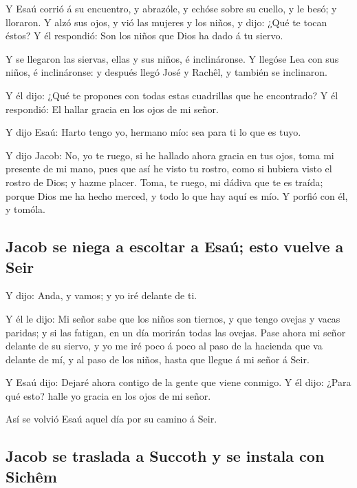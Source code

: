  Y Esaú corrió á su encuentro, y abrazóle, y echóse sobre su
cuello, y le besó; y lloraron.  Y alzó sus ojos, y vió las
mujeres y los niños, y dijo: ¿Qué te tocan éstos? Y él respondió: Son
los niños que Dios ha dado á tu siervo.

 Y se llegaron las siervas, ellas y sus niños, é
inclináronse.  Y llegóse Lea con sus niños, é inclináronse:
y después llegó José y Rachêl, y también se inclinaron.

 Y él dijo: ¿Qué te propones con todas estas cuadrillas que
he encontrado? Y él respondió: El hallar gracia en los ojos de mi señor.

 Y dijo Esaú: Harto tengo yo, hermano mío: sea para ti lo
que es tuyo.

 Y dijo Jacob: No, yo te ruego, si he hallado ahora gracia
en tus ojos, toma mi presente de mi mano, pues que así he visto tu
rostro, como si hubiera visto el rostro de Dios; y hazme placer.
 Toma, te ruego, mi dádiva que te es traída; porque Dios me
ha hecho merced, y todo lo que hay aquí es mío. Y porfió con él, y
tomóla.

\hypertarget{jacob-se-niega-a-escoltar-a-esauxfa-esto-vuelve-a-seir}{%
\subsection{Jacob se niega a escoltar a Esaú; esto vuelve a
Seir}\label{jacob-se-niega-a-escoltar-a-esauxfa-esto-vuelve-a-seir}}

 Y dijo: Anda, y vamos; y yo iré delante de ti.

 Y él le dijo: Mi señor sabe que los niños son tiernos, y
que tengo ovejas y vacas paridas; y si las fatigan, en un día morirán
todas las ovejas.  Pase ahora mi señor delante de su
siervo, y yo me iré poco á poco al paso de la hacienda que va delante de
mí, y al paso de los niños, hasta que llegue á mi señor á Seir.

 Y Esaú dijo: Dejaré ahora contigo de la gente que viene
conmigo. Y él dijo: ¿Para qué esto? halle yo gracia en los ojos de mi
señor.

 Así se volvió Esaú aquel día por su camino á Seir.

\hypertarget{jacob-se-traslada-a-succoth-y-se-instala-con-sichuxeam}{%
\subsection{Jacob se traslada a Succoth y se instala con
Sichêm}\label{jacob-se-traslada-a-succoth-y-se-instala-con-sichuxeam}}


